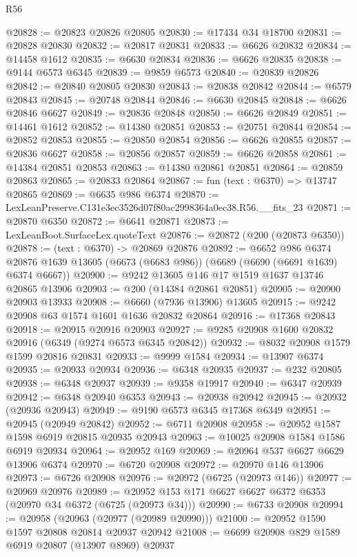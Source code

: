\begin{lexlean}{R56}
\begin{coremodule}
@20828 := @20823 @20826 @20805
@20830 := @17434 @34 @18700
@20831 := @20828 @20830
@20832 := @20817 @20831
@20833 := @6626 @20832
@20834 := @14458 @1612
@20835 := @6630 @20834
@20836 := @6626 @20835
@20838 := @9144 @6573 @6345
@20839 := @9859 @6573
@20840 := @20839 @20826
@20842 := @20840 @20805 @20830
@20843 := @20838 @20842
@20844 := @6579 @20843
@20845 := @20748 @20844
@20846 := @6630 @20845
@20848 := @6626 @20846 @6627
@20849 := @20836 @20848
@20850 := @6626 @20849
@20851 := @14461 @1612
@20852 := @14380 @20851
@20853 := @20751 @20844
@20854 := @20852 @20853
@20855 := @20850 @20854
@20856 := @6626 @20855
@20857 := @20836 @6627
@20858 := @20856 @20857
@20859 := @6626 @20858
@20861 := @14384 @20851 @20853
@20863 := @14380 @20861 @20851
@20864 := @20859 @20863
@20865 := @20833 @20864
@20867 := fun (text : @6370) => @13747 @20865
@20869 := @6635 @986 @6374
@20870 := LexLeanPreserve.C131e3ec3526d07f80ac2998364a0ec38.R56.__fits_23
@20871 := @20870 @6350
@20872 := @6641 @20871
@20873 := LexLeanBoot.SurfaceLex.quoteText
@20876 := @20872 (@200 (@20873 @6350))
@20878 := (text : @6370) -> @20869 @20876
@20892 := @6652
    @986
    @6374
    @20876
    @1639
    @13605
    (@6673 (@6683 @986))
    (@6689 (@6690 (@6691 @1639) @6374 @6667))
@20900 := @9242 @13605 @146 @17 @1519 @1637 @13746 @20865 @13906
@20903 := @200 (@14384 @20861 @20851)
@20905 := @20900 @20903 @13933
@20908 := @6660 (@7936 @13906) @13605
@20915 := @9242 @20908 @63 @1574 @1601 @1636 @20832 @20864
@20916 := @17368 @20843
@20918 := @20915 @20916 @20903
@20927 := @9285 @20908 @1600 @20832 @20916 (@6349 (@9274 @6573 @6345 @20842))
@20932 := @8032 @20908 @1579 @1599 @20816 @20831
@20933 := @9999 @1584
@20934 := @13907 @6374
@20935 := @20933 @20934
@20936 := @6348 @20935
@20937 := @232 @20805
@20938 := @6348 @20937
@20939 := @9358 @19917
@20940 := @6347 @20939
@20942 := @6348 @20940 @6353
@20943 := @20938 @20942
@20945 := @20932 (@20936 @20943)
@20949 := @9190 @6573 @6345 @17368 @6349
@20951 := @20945 (@20949 @20842)
@20952 := @6711 @20908
@20958 := @20952 @1587 @1598 @6919 @20815 @20935 @20943
@20963 := @10025 @20908 @1584 @1586 @6919 @20934
@20964 := @20952 @169
@20969 := @20964 @537 @6627 @6629 @13906 @6374
@20970 := @6720 @20908
@20972 := @20970 @146 @13906
@20973 := @6726 @20908
@20976 := @20972 (@6725 (@20973 @146))
@20977 := @20969 @20976
@20989 := @20952 @153 @171 @6627 @6627 @6372 @6353 (@20970 @34 @6372 (@6725 (@20973 @34)))
@20990 := @6733 @20908
@20994 := @20958 (@20963 (@20977 (@20989 @20990)))
@21000 := @20952 @1590 @1597 @20808 @20814 @20937 @20942
@21008 := @6699 @20908 @829 @1589 @6919 @20807 (@13907 @8969) @20937

\end{coremodule}
\end{lexlean}
